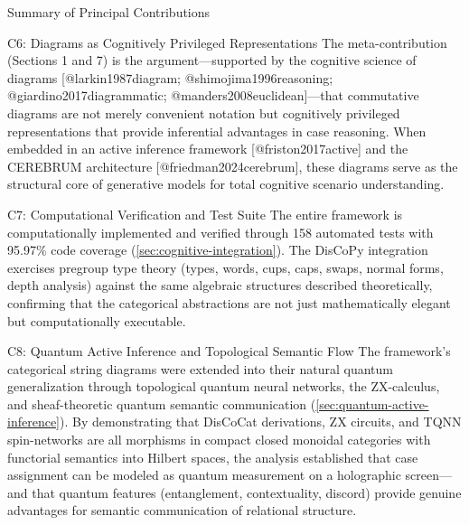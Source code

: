 \documentclass[
  ignorenonframetext,
]{beamer}
\begin{document}
\begin{frame}{Summary of Principal Contributions}
\begin{block}{C6: Diagrams as Cognitively Privileged Representations}
\protect{}\label{c6-diagrams-as-cognitively-privileged-representations}
The meta-contribution (Sections 1 and 7) is the argument---supported by
the cognitive science of diagrams {[}@larkin1987diagram;
@shimojima1996reasoning; @giardino2017diagrammatic;
@manders2008euclidean{]}---that commutative diagrams are not merely
convenient notation but cognitively privileged representations that
provide inferential advantages in case reasoning. When embedded in an
active inference framework {[}@friston2017active{]} and the CEREBRUM
architecture {[}@friedman2024cerebrum{]}, these diagrams serve as the
structural core of generative models for total cognitive scenario
understanding.
\end{block}

\begin{block}{C7: Computational Verification and Test Suite}
\protect{}\label{c7-computational-verification-and-test-suite}
The entire framework is computationally implemented and verified through
158 automated tests with 95.97\% code coverage
(\autoref{sec:cognitive-integration}). The DisCoPy integration exercises
pregroup type theory (types, words, cups, caps, swaps, normal forms,
depth analysis) against the same algebraic structures described
theoretically, confirming that the categorical abstractions are not just
mathematically elegant but computationally executable.
\end{block}

\begin{block}{C8: Quantum Active Inference and Topological Semantic
Flow}
\protect{}\label{c8-quantum-active-inference-and-topological-semantic-flow}
The framework's categorical string diagrams were extended into their
natural quantum generalization through topological quantum neural
networks, the ZX-calculus, and sheaf-theoretic quantum semantic
communication (\autoref{sec:quantum-active-inference}). By demonstrating
that DisCoCat derivations, ZX circuits, and TQNN spin-networks are all
morphisms in compact closed monoidal categories with functorial
semantics into Hilbert spaces, the analysis established that case
assignment can be modeled as quantum measurement on a holographic
screen---and that quantum features (entanglement, contextuality,
discord) provide genuine advantages for semantic communication of
relational structure.
\end{block}


\end{frame}
\end{document}

